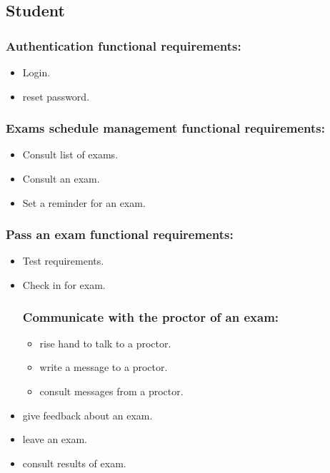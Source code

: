 \documentclass[]{uc2pfecaneva}
\begin{document}
    \subsection{Student}
    \begin{itemize}
        \subsubsection{Authentication functional requirements:}
        \begin{itemize}
            \item Login.
            \item reset password.
        \end{itemize}

        \subsubsection{Exams schedule management functional requirements:}
        \begin{itemize}
            \item Consult list of exams.
            \item Consult an exam.
            \item Set a reminder for an exam.
        \end{itemize}

        \subsubsection{Pass an exam functional requirements:}
        \begin{itemize}
            \item Test requirements.
            \item Check in for exam.
            \subsubsection{Communicate with the proctor of an exam:}
            \begin{itemize}
                \item rise hand to talk to a proctor.
                \item write a message to a proctor.
                \item consult messages from a proctor.
            \end{itemize}

            \item give feedback about an exam.
            \item leave an exam.
            \item consult results of exam.
        \end{itemize}


\end{itemize}
\end{document}
